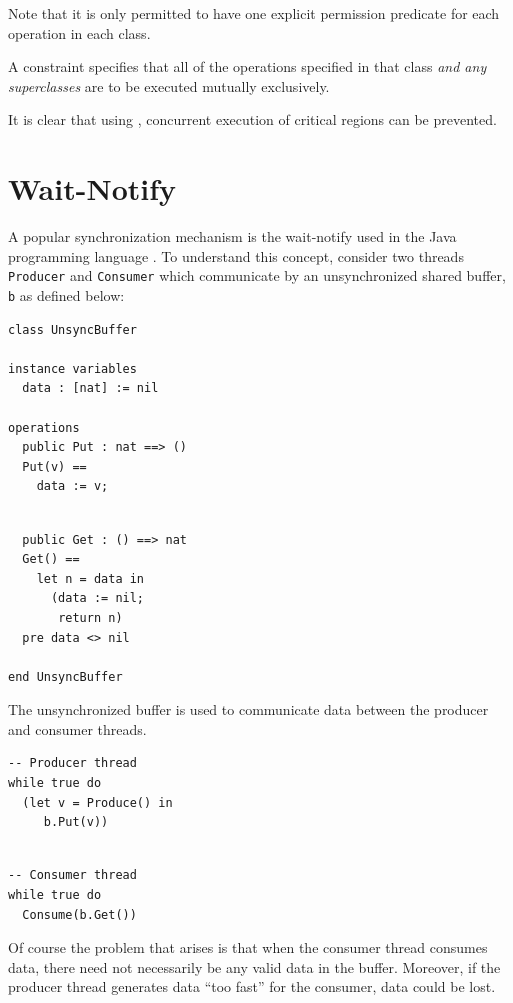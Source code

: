 \documentclass{overturerepchap}
\begin{document}
Note that it is only permitted to have one explicit permission predicate for
each operation in each class.

A {\bf{}} constraint specifies that all of the operations
specified in that class \emph{and any superclasses} are to be executed
mutually exclusively.

It is clear that using {\bf{}}, concurrent execution of critical regions
can be prevented.

\section{Wait-Notify}\label{sec:waitnotify}

A popular synchronization mechanism is the wait-notify used in the
Java programming language \cite{Gosling&00}. To understand this
concept, consider two threads \texttt{Producer} and 
\texttt{Consumer} which communicate
by an unsynchronized shared buffer, \texttt{b} as defined below:

\begin{multicols}{2}
\begin{lstlisting}
class UnsyncBuffer

instance variables
  data : [nat] := nil

operations
  public Put : nat ==> ()
  Put(v) ==
    data := v;
\end{lstlisting}
\begin{lstlisting}

  public Get : () ==> nat
  Get() ==
    let n = data in
      (data := nil;
       return n)
  pre data <> nil

end UnsyncBuffer
\end{lstlisting}
\end{multicols}

The unsynchronized buffer is used to communicate data between the producer and
consumer threads.

\begin{multicols}{2}
\begin{lstlisting}
-- Producer thread
while true do
  (let v = Produce() in
     b.Put(v))
\end{lstlisting}
\begin{lstlisting}

-- Consumer thread
while true do
  Consume(b.Get())
\end{lstlisting}
\end{multicols}

Of course the problem that arises is that when the consumer thread
consumes data, there need not necessarily be any valid data in the
buffer. Moreover, if the producer thread generates data ``too fast''
for the consumer, data could be lost.
\end{document}
